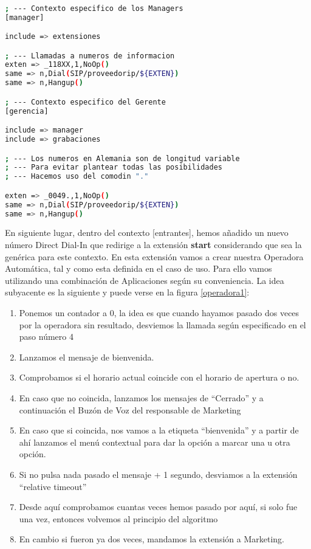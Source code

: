 \begin{lstlisting}[language=bash,title={/etc/asterisk/extensions.conf}]

; --- Contexto especifico de los Managers
[manager]

include => extensiones

; --- Llamadas a numeros de informacion
exten => _118XX,1,NoOp()
same => n,Dial(SIP/proveedorip/${EXTEN})
same => n,Hangup()

; --- Contexto especifico del Gerente
[gerencia]

include => manager
include => grabaciones

; --- Los numeros en Alemania son de longitud variable
; --- Para evitar plantear todas las posibilidades
; --- Hacemos uso del comodin "."

exten => _0049.,1,NoOp()
same => n,Dial(SIP/proveedorip/${EXTEN})
same => n,Hangup()

\end{lstlisting}

En siguiente lugar, dentro del contexto [entrantes], hemos añadido un nuevo número Direct Dial-In que redirige a la extensión \textbf{start} considerando que sea la genérica para este contexto. En esta extensión vamos a crear nuestra Operadora Automática, tal y como esta definida en el caso de uso. Para ello vamos utilizando una combinación de Aplicaciones según su conveniencia. La idea subyacente es la siguiente y puede verse en la figura \ref{operadora1}:

\begin{enumerate}

\item Ponemos un contador a 0, la idea es que cuando hayamos pasado dos veces por la operadora sin resultado, desviemos la llamada según especificado en el paso número 4
\item Lanzamos el mensaje de bienvenida.
\item Comprobamos si el horario actual coincide con el horario de apertura o no. 
\item En caso que no coincida, lanzamos los mensajes de ``Cerrado'' y a continuación el Buzón de Voz del responsable de Marketing
\item En caso que si coincida, nos vamos a la etiqueta ``bienvenida'' y a partir de ahí lanzamos el menú contextual para dar la opción a marcar una u otra opción. 
\item Si no pulsa nada pasado el mensaje + 1 segundo, desviamos a la extensión ``relative timeout'' 
\item Desde aquí comprobamos cuantas veces hemos pasado por aquí, si solo fue una vez, entonces volvemos al principio del algoritmo
\item En cambio si fueron ya dos veces, mandamos la extensión a Marketing.

\end{enumerate}


